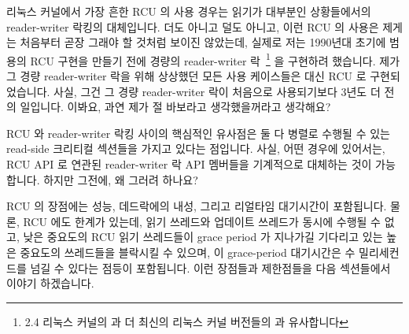 리눅스 커널에서 가장 흔한 RCU 의 사용 경우는 읽기가 대부분인 상황들에서의
reader-writer 락킹의 대체입니다.
더도 아니고 덜도 아니고, 이런 RCU 의 사용은 제게는 처음부터 곧장 그래야 할
것처럼 보이진 않았는데, 실제로 저는 1990년대 초기에 범용의 RCU 구현을 만들기
전에 경량의 reader-writer 락~\cite{WilsonCHsieh92a}\footnote{
	2.4 리눅스 커널의  과 더 최신의 리눅스 커널 버전들의
	 과 유사합니다}
을 구현하려 했습니다.
제가 그 경량 reader-writer 락을 위해 상상했던 모든 사용 케이스들은 대신 RCU 로
구현되었습니다.
사실, 그건 그 경량 reader-writer 락이 처음으로 사용되기보다 3년도 더 전의
일입니다.
이봐요, 과연 제가 절 바보라고 생각했을꺼라고 생각해요?

RCU 와 reader-writer 락킹 사이의 핵심적인 유사점은 둘 다 병렬로 수행될 수 있는
read-side 크리티컬 섹션들을 가지고 있다는 점입니다.
사실, 어떤 경우에 있어서는, RCU API 로 연관된 reader-writer 락 API 멤버들을
기계적으로 대체하는 것이 가능합니다.
하지만 그전에, 왜 그러려 하나요?

RCU 의 장점에는 성능, 데드락에의 내성, 그리고 리얼타임 대기시간이 포함됩니다.
물론, RCU 에도 한계가 있는데, 읽기 쓰레드와 업데이트 쓰레드가 동시에
수행될 수 없고, 낮은 중요도의 RCU 읽기 쓰레드들이 grace period 가 지나가길
기다리고 있는 높은 중요도의 쓰레드들을 블락시킬 수 있으며, 이 grace-period
대기시간은 수 밀리세컨드를 넘길 수 있다는 점등이 포함됩니다.
이런 장점들과 제한점들을 다음 섹션들에서 이야기 하겠습니다.
\iffalse

